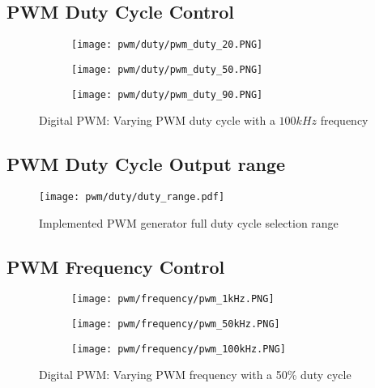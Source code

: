 \subsection*{PWM Duty Cycle Control}
\begin{figure}[H]
    
    \centering
    \begin{subfigure}{0.45\textwidth}
        \texttt{[image: pwm/duty/pwm\_duty\_20.PNG]}
    \end{subfigure}
    \begin{subfigure}{0.45\textwidth}
        \texttt{[image: pwm/duty/pwm\_duty\_50.PNG]}
    \end{subfigure}
    \begin{subfigure}{0.45\textwidth}
        \texttt{[image: pwm/duty/pwm\_duty\_90.PNG]}
    \end{subfigure}
    \caption{Digital PWM: Varying PWM duty cycle with a $100kHz$ frequency}

\end{figure}

\subsection*{PWM Duty Cycle Output range}

\begin{figure}[!h]
    \centering
    \texttt{[image: pwm/duty/duty\_range.pdf]}
    \caption{Implemented PWM generator full duty cycle selection range}
    \label{A:pwm_range}
\end{figure}


\subsection*{PWM Frequency Control}
\begin{figure}[H]
    \centering
    \begin{subfigure}{0.45\textwidth}
        \texttt{[image: pwm/frequency/pwm\_1kHz.PNG]}
    \end{subfigure}
    \begin{subfigure}{0.45\textwidth}
        \texttt{[image: pwm/frequency/pwm\_50kHz.PNG]}
    \end{subfigure}
    \begin{subfigure}{0.45\textwidth}
        \texttt{[image: pwm/frequency/pwm\_100kHz.PNG]}
    \end{subfigure}
    \caption{Digital PWM: Varying PWM frequency with a 50\% duty cycle}

\end{figure}